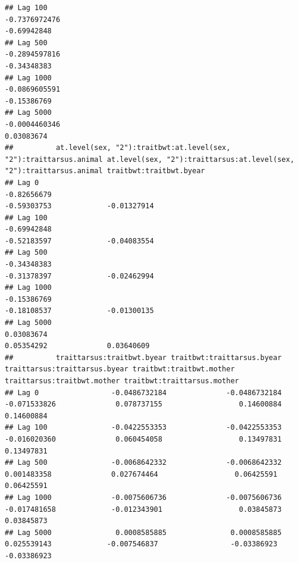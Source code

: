 \documentclass[
  12pt,
]{book}
\begin{document}
\begin{verbatim}
## Lag 100                                                   -0.7376972476                                                       -0.69942848
## Lag 500                                                   -0.2894597816                                                       -0.34348383
## Lag 1000                                                  -0.0869605591                                                       -0.15386769
## Lag 5000                                                  -0.0004460346                                                        0.03083674
##          at.level(sex, "2"):traitbwt:at.level(sex, "2"):traittarsus.animal at.level(sex, "2"):traittarsus:at.level(sex, "2"):traittarsus.animal traitbwt:traitbwt.byear
## Lag 0                                                          -0.82656679                                                          -0.59303753             -0.01327914
## Lag 100                                                        -0.69942848                                                          -0.52183597             -0.04083554
## Lag 500                                                        -0.34348383                                                          -0.31378397             -0.02462994
## Lag 1000                                                       -0.15386769                                                          -0.18108537             -0.01300135
## Lag 5000                                                        0.03083674                                                           0.05354292              0.03640609
##          traittarsus:traitbwt.byear traitbwt:traittarsus.byear traittarsus:traittarsus.byear traitbwt:traitbwt.mother traittarsus:traitbwt.mother traitbwt:traittarsus.mother
## Lag 0                 -0.0486732184              -0.0486732184                  -0.071533826              0.078737155                  0.14600884                  0.14600884
## Lag 100               -0.0422553353              -0.0422553353                  -0.016020360              0.060454058                  0.13497831                  0.13497831
## Lag 500               -0.0068642332              -0.0068642332                   0.001483358              0.027674464                  0.06425591                  0.06425591
## Lag 1000              -0.0075606736              -0.0075606736                  -0.017481658             -0.012343901                  0.03845873                  0.03845873
## Lag 5000               0.0008585885               0.0008585885                   0.025539143             -0.007546837                 -0.03386923                 -0.03386923

\end{verbatim}
\end{document}
